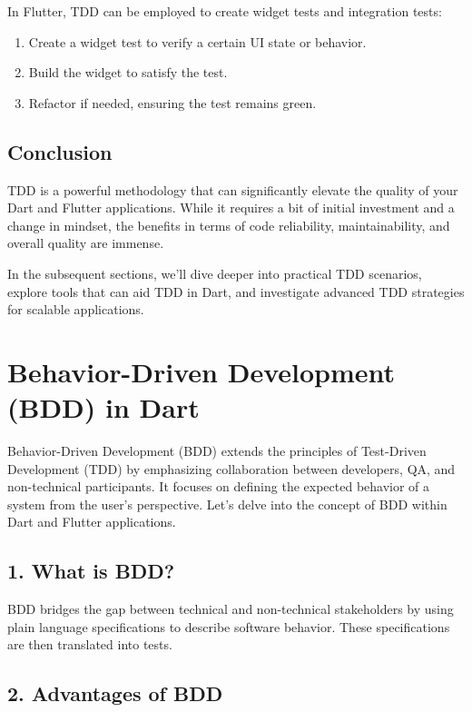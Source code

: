 \documentclass[
]{article}
\providecommand{\tightlist}{%
  \setlength{\itemsep}{0pt}\setlength{\parskip}{0pt}}
\begin{document}
In Flutter, TDD can be employed to create widget tests and integration
tests:

\begin{enumerate}
\def\labelenumi{\arabic{enumi}.}
\tightlist
\item
  Create a widget test to verify a certain UI state or behavior.
\item
  Build the widget to satisfy the test.
\item
  Refactor if needed, ensuring the test remains green.
\end{enumerate}

\subsection{Conclusion}\label{conclusion-14}

TDD is a powerful methodology that can significantly elevate the quality
of your Dart and Flutter applications. While it requires a bit of
initial investment and a change in mindset, the benefits in terms of
code reliability, maintainability, and overall quality are immense.

In the subsequent sections, we'll dive deeper into practical TDD
scenarios, explore tools that can aid TDD in Dart, and investigate
advanced TDD strategies for scalable applications.

\section{Behavior-Driven Development (BDD) in
Dart}\label{behavior-driven-development-bdd-in-dart}

Behavior-Driven Development (BDD) extends the principles of Test-Driven
Development (TDD) by emphasizing collaboration between developers, QA,
and non-technical participants. It focuses on defining the expected
behavior of a system from the user's perspective. Let's delve into the
concept of BDD within Dart and Flutter applications.

\subsection{1. What is BDD?}\label{what-is-bdd}

BDD bridges the gap between technical and non-technical stakeholders by
using plain language specifications to describe software behavior. These
specifications are then translated into tests.

\subsection{2. Advantages of BDD}\label{advantages-of-bdd}
\end{document}
